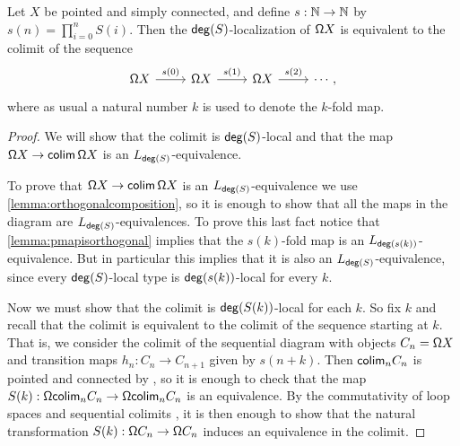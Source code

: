 \begin{prp}\label{theorem:localizationastelescope}
    Let $X$ be pointed and simply connected, and
    define $s : \mathbb{N} \to \mathbb{N}$ by $s(n) = \prod_{i=0}^n S(i)$.
    Then the $\mathsf{deg}(S)$-localization of $\mathsf{\Omega} X$ is equivalent to the colimit of the sequence
\begin{equation*}
\begin{tikzcd}
\loopspacesym X \arrow[r,"s(0)"] & \loopspacesym X \arrow[r,"s(1)"] & \loopspacesym X \arrow[r,"s(2)"] & \cdots,
\end{tikzcd}
\end{equation*}
    where as usual a natural number $k$ is used to denote the $k$-fold map.
\end{prp}

\begin{proof}
    We will show that the colimit is $\mathsf{deg}(S)$-local and that
    the map $\mathsf{\Omega} X \to \mathsf{colim}\, \mathsf{\Omega} X$ is an $L_{\mathsf{deg}(S)}$-equivalence.
    
    To prove that $\mathsf{\Omega} X \to \mathsf{colim}\, \mathsf{\Omega} X$ is an $L_{\mathsf{deg}(S)}$-equivalence
    we use \cref{lemma:orthogonalcomposition}, so it is enough to show that all the maps in the
    diagram are $L_{\mathsf{deg}(S)}$-equivalences. To prove this last fact notice that \cref{lemma:pmapisorthogonal}
    implies that the $s(k)$-fold map is an $L_{\mathsf{deg}(s(k))}$-equivalence. But in particular this implies that it is also an
    $L_{\mathsf{deg}(S)}$-equivalence, since every $\mathsf{deg}(S)$-local type is $\mathsf{deg}(s(k))$-local for every $k$.

    Now we must show that the colimit is $\mathsf{deg}(S(k))$-local for each $k$.
    So fix $k$ and recall that
    the colimit is equivalent to the colimit of the sequence starting at $k$.
    That is, we consider the colimit of the sequential diagram with objects
    $C_n = \mathsf{\Omega} X$ and transition maps $h_n : C_n \to C_{n+1}$ given by $s(n+k)$.
    Then $\mathsf{colim}_n C_n$ is pointed and connected by \cite{DoornRijkeSojakova},
    so it is enough to check that the map $S(k) : \mathsf{\Omega} \mathsf{colim}_n C_n \to \mathsf{\Omega} \mathsf{colim}_n C_n$ is an equivalence.
    By the commutativity of loop spaces and sequential colimits \cite{DoornRijkeSojakova},
    it is then enough to show that the natural transformation $S(k) : \mathsf{\Omega} C_n \to \mathsf{\Omega} C_n$
    induces an equivalence in the colimit.


\end{proof}
